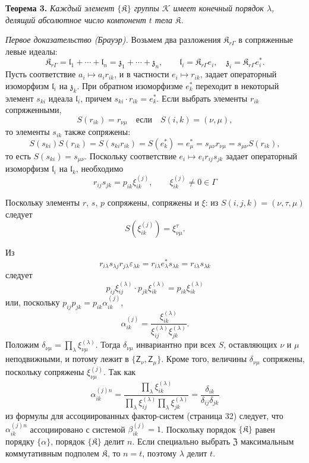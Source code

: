 \documentclass[11pt]{article}
\begin{document}
\textbf{Теорема 3.} \emph{Каждый элемент \(\{\mathfrak K\}\) группы \(\mathscr K\) имеет конечный порядок \(\lambda\), делящий абсолютное число компонент \(t\) тела \(\mathfrak K\).}

\emph{Первое доказательство (Брауэр).} Возьмем два разложения \(\mathfrak K_{r\Gamma}\) в сопряженные левые идеалы:
\[
\mathfrak K_{r\Gamma}=\mathfrak l_1+\cdots+\mathfrak l_n=\mathfrak z_1+\cdots+\mathfrak z_n,\qquad
\mathfrak l_i=\mathfrak K_{r\Gamma}e_i,\quad
\mathfrak z_i=\mathfrak K_{r\Gamma}e_i^*.
\]
Пусть соответствие \(a_i\mapsto a_ir_{ik}\), и в частности \(e_i\mapsto r_{ik}\), задает операторный изоморфизм \(\mathfrak l_i\) на \(\mathfrak z_k\). При обратном изоморфизме \(e_k^*\) переходит в некоторый элемент \(s_{ki}\) идеала \(\mathfrak l_i\), причем \(s_{ki}\cdot r_{ik}=e_k^*\). Если выбрать элементы \(r_{ik}\) сопряженными,
\[
S(r_{ik})=r_{\nu\mu}\quad\text{если}\quad S(i,k)=(\nu,\mu),
\]
то элементы \(s_{ik}\) также сопряжены:
\[
S(s_{ki})S(r_{ik})=S(s_{ki}r_{ik})=S(e_k^*)=e_\mu^*
=s_{\mu\nu}r_{\nu\mu}=s_{\mu\nu}S(r_{ik}),
\]
то есть \(S(s_{ki})=s_{\mu\nu}\). Поскольку соответствие \(e_i\mapsto e_ir_{ij}s_{jk}\) задает операторный изоморфизм \(\mathfrak l_i\) на \(\mathfrak l_k\), необходимо
\[
r_{ij}s_{jk}=p_{ik}\xi_{ik}^{(j)},\qquad
\xi_{ik}^{(j)}\ne0\in\Gamma
\]

Поскольку элементы \(r\), \(s\), \(p\) сопряжены, сопряжены и \(\xi\): из \(S(i,j,k)=(\nu,\tau,\mu)\) следует
\[
S(\xi_{ik}^{(j)})=\xi_{\nu\mu}^{\tau}.
\]

Из
\[
r_{i\lambda}s_{\lambda j}r_{j\lambda}\varepsilon_{\lambda k}
=r_{i\lambda}e_\lambda^*s_{\lambda k}
=r_{i\lambda}s_{\lambda k}
\]
следует
\[
p_{ij}\xi_{ij}^{(\lambda)}\cdot p_{jk}\xi_{ik}^{(\lambda)}
=p_{ik}\xi_{ik}^{(\lambda)}
\]
или, поскольку \(p_{ij}p_{jk}=p_{ik}\alpha_{ik}^{(j)}\),
\[
\alpha_{ik}^{(j)}
=\frac{\xi_{ik}^{(\lambda)}}{\xi_{ij}^{(\lambda)}\xi_{jk}^{(\lambda)}}.
\]
Положим \(\delta_{\nu\mu}=\prod_{\lambda}\xi_{\nu\mu}^{(\lambda)}\). Тогда \(\delta_{\nu\mu}\) инвариантно при всех \(S\), оставляющих \(\nu\) и \(\mu\) неподвижными, и потому лежит в \(\{\mathsf{Z}_\nu,\mathsf{Z}_\mu\}\). Кроме того, величины \(\delta_{\nu\mu}\) сопряжены, поскольку сопряжены \(\xi_{\nu\mu}^{(j)}\). Так как
\[
\alpha_{ik}^{(j)n}
=\frac{\prod_{\lambda}\xi_{ik}^{(\lambda)}}
       {\prod_{\lambda}\xi_{ij}^{(\lambda)}\prod_{\lambda}\xi_{jk}^{(\lambda)}}
=\frac{\delta_{ik}}{\delta_{ij}\delta_{jk}}
\]
из формулы для ассоциированных фактор-систем (страница 32) следует, что \(\alpha_{ik}^{(j)n}\) ассоциировано с системой \(\beta_{ik}^{(j)}=1\). Поскольку порядок \(\{\mathfrak K\}\) равен порядку \(\{\alpha\}\), порядок \(\{\mathfrak K\}\) делит \(n\). Если специально выбрать \(\mathfrak Z\) максимальным коммутативным подполем \(\mathfrak K\), то \(n=t\), поэтому \(\lambda\) делит \(t\).
\end{document}
